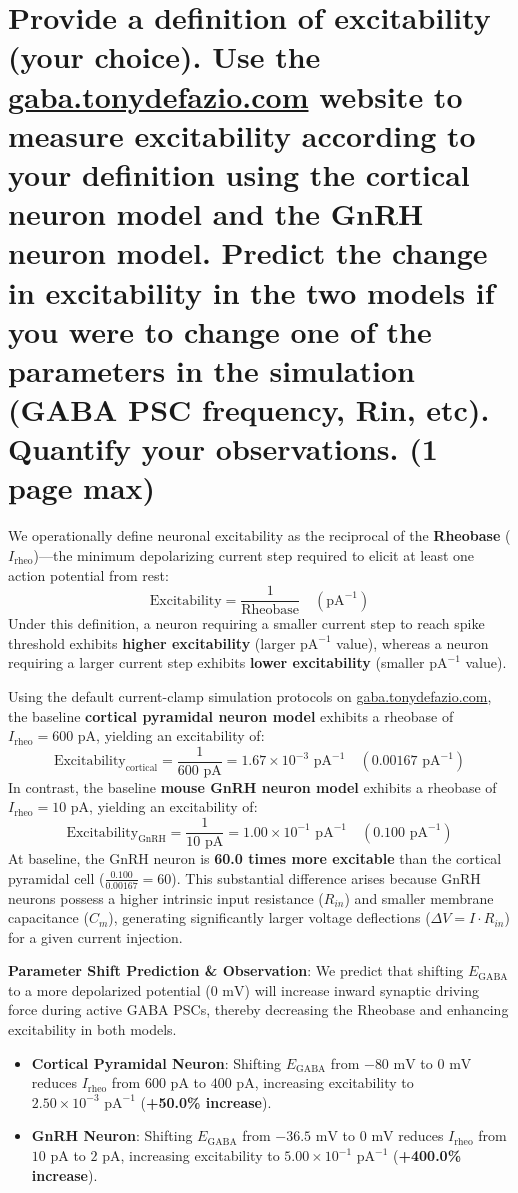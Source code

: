 \documentclass{article}
\begin{document}
\section{
    Provide a definition of excitability (your choice).
    Use the \href{gaba.tonydefazio.com}{gaba.tonydefazio.com} website to measure excitability according to your definition using the cortical neuron model and the GnRH neuron model.
    Predict the change in excitability in the two models if you were to change one of the parameters in the simulation (GABA PSC frequency, Rin, etc).
    Quantify your observations. (1 page max)
}
We operationally define neuronal excitability as the reciprocal of the \textbf{Rheobase} ($I_{\text{rheo}}$)—the minimum depolarizing current step required to elicit at least one action potential from rest:
$$\text{Excitability} = \frac{1}{\text{Rheobase}} \quad (\text{pA}^{-1})$$
Under this definition, a neuron requiring a smaller current step to reach spike threshold exhibits \textbf{higher excitability} (larger $\text{pA}^{-1}$ value), whereas a neuron requiring a larger current step exhibits \textbf{lower excitability} (smaller $\text{pA}^{-1}$ value).

Using the default current-clamp simulation protocols on \href{https://gaba.tonydefazio.com}{gaba.tonydefazio.com}, the baseline \textbf{cortical pyramidal neuron model} exhibits a rheobase of $I_{\text{rheo}} = 600\text{ pA}$, yielding an excitability of:
$$\text{Excitability}_{\text{cortical}} = \frac{1}{600\text{ pA}} = 1.67 \times 10^{-3}\text{ pA}^{-1} \quad (0.00167\text{ pA}^{-1})$$
In contrast, the baseline \textbf{mouse GnRH neuron model} exhibits a rheobase of $I_{\text{rheo}} = 10\text{ pA}$, yielding an excitability of:
$$\text{Excitability}_{\text{GnRH}} = \frac{1}{10\text{ pA}} = 1.00 \times 10^{-1}\text{ pA}^{-1} \quad (0.100\text{ pA}^{-1})$$
At baseline, the GnRH neuron is \textbf{60.0 times more excitable} than the cortical pyramidal cell ($\frac{0.100}{0.00167} = 60$). This substantial difference arises because GnRH neurons possess a higher intrinsic input resistance ($R_{in}$) and smaller membrane capacitance ($C_m$), generating significantly larger voltage deflections ($\Delta V = I \cdot R_{in}$) for a given current injection.

\textbf{Parameter Shift Prediction \& Observation}: We predict that shifting $E_{\text{GABA}}$ to a more depolarized potential ($0\text{ mV}$) will increase inward synaptic driving force during active GABA PSCs, thereby decreasing the Rheobase and enhancing excitability in both models.
\begin{itemize}
    \item \textbf{Cortical Pyramidal Neuron}: Shifting $E_{\text{GABA}}$ from $-80\text{ mV}$ to $0\text{ mV}$ reduces $I_{\text{rheo}}$ from $600\text{ pA}$ to $400\text{ pA}$, increasing excitability to $2.50 \times 10^{-3}\text{ pA}^{-1}$ (\textbf{+50.0\% increase}).
    \item \textbf{GnRH Neuron}: Shifting $E_{\text{GABA}}$ from $-36.5\text{ mV}$ to $0\text{ mV}$ reduces $I_{\text{rheo}}$ from $10\text{ pA}$ to $2\text{ pA}$, increasing excitability to $5.00 \times 10^{-1}\text{ pA}^{-1}$ (\textbf{+400.0\% increase}).
\end{itemize}
\end{document}
